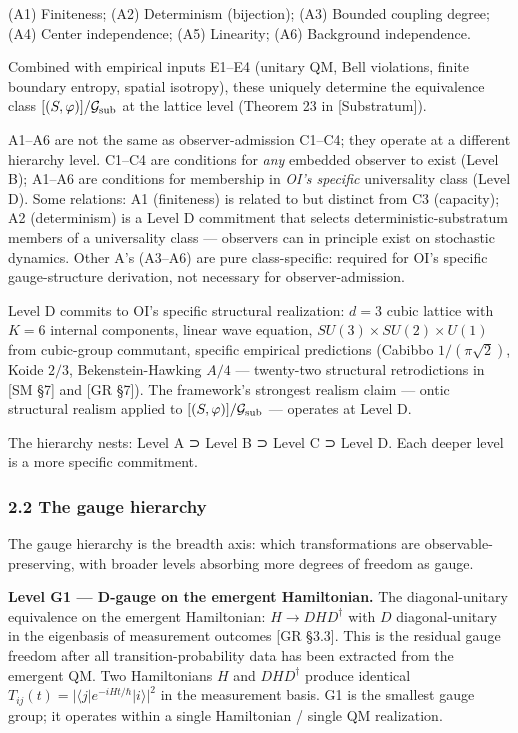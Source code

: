 \documentclass[
]{article}
\begin{document}
(A1) Finiteness; (A2) Determinism (bijection); (A3) Bounded coupling
degree; (A4) Center independence; (A5) Linearity; (A6) Background
independence.

Combined with empirical inputs E1--E4 (unitary QM, Bell violations,
finite boundary entropy, spatial isotropy), these uniquely determine the
equivalence class \([(S, \varphi)]/\mathcal{G}_{\rm sub}\) at the
lattice level (Theorem 23 in {[}Substratum{]}).

A1--A6 are not the same as observer-admission C1--C4; they operate at a
different hierarchy level. C1--C4 are conditions for \emph{any} embedded
observer to exist (Level B); A1--A6 are conditions for membership in
\emph{OI's specific} universality class (Level D). Some relations: A1
(finiteness) is related to but distinct from C3 (capacity); A2
(determinism) is a Level D commitment that selects
deterministic-substratum members of a universality class --- observers
can in principle exist on stochastic dynamics. Other A's (A3--A6) are
pure class-specific: required for OI's specific gauge-structure
derivation, not necessary for observer-admission.

Level D commits to OI's specific structural realization: \(d=3\) cubic
lattice with \(K=6\) internal components, linear wave equation,
\(SU(3) \times SU(2) \times U(1)\) from cubic-group commutant, specific
empirical predictions (Cabibbo \(1/(\pi\sqrt{2})\), Koide \(2/3\),
Bekenstein-Hawking \(A/4\) --- twenty-two structural retrodictions in
{[}SM §7{]} and {[}GR §7{]}). The framework's strongest realism claim
--- ontic structural realism applied to
\([(S, \varphi)]/\mathcal{G}_{\rm sub}\) --- operates at Level D.

The hierarchy nests: Level A ⊃ Level B ⊃ Level C ⊃ Level D. Each deeper
level is a more specific commitment.

\hypertarget{the-gauge-hierarchy}{%
\subsubsection{2.2 The gauge hierarchy}\label{the-gauge-hierarchy}}

The gauge hierarchy is the breadth axis: which transformations are
observable-preserving, with broader levels absorbing more degrees of
freedom as gauge.

\textbf{Level G1 --- D-gauge on the emergent Hamiltonian.} The
diagonal-unitary equivalence on the emergent Hamiltonian:
\(H \to D H D^\dagger\) with \(D\) diagonal-unitary in the eigenbasis of
measurement outcomes {[}GR §3.3{]}. This is the residual gauge freedom
after all transition-probability data has been extracted from the
emergent QM. Two Hamiltonians \(H\) and \(DHD^\dagger\) produce
identical \(T_{ij}(t) = |\langle j|e^{-iHt/\hbar}|i\rangle|^2\) in the
measurement basis. G1 is the smallest gauge group; it operates within a
single Hamiltonian / single QM realization.
\end{document}
